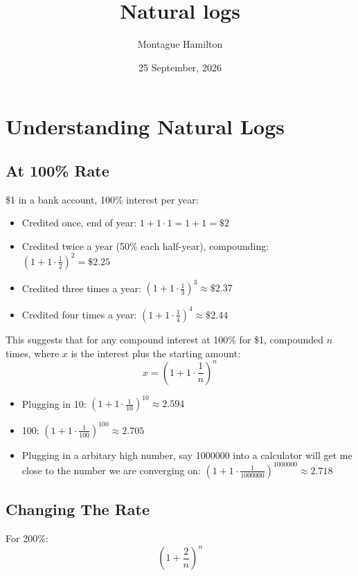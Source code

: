 \documentclass{article}
\begin{document}
\title{Natural logs}
\author{Montague Hamilton}
\date{25 September, 2026}
\maketitle

\section{Understanding Natural Logs}
\subsection{At 100\% Rate}

\$1 in a bank account, 100\% interest per year:
\begin{itemize}
  \item Credited once, end of year: $1 + 1 \cdot 1 = 1 + 1 = \$2$
  \item Credited twice a year (50\% each half-year), compounding: $(1 + 1 \cdot \frac{1}{2})^{2} = \$2.25$
  \item Credited three times a year: $(1 + 1 \cdot \frac{1}{3})^{3} \approx \$2.37$
  \item Credited four times a year: $(1 + 1 \cdot \frac{1}{4})^4 \approx \$2.44$
\end{itemize}
This suggests that for any compound interest at 100\% for \$1, compounded $n$ times,
where $x$ is the interest plus the starting amount:
\[
  x = \left(1 + 1 \cdot \frac{1}{n} \right)^{n}
\]
\begin{itemize}  
  \item Plugging in 10: $(1 + 1 \cdot \frac{1}{10})^{10} \approx 2.594$
  \item 100: $(1 + 1 \cdot \frac{1}{100})^{100} \approx  2.705$
  \item Plugging in a arbitary high number, say 1000000 into a calculator will get me close 
  to the number we are converging on: $(1 + 1 \cdot \frac{1}{1000000})^{1000000} \approx 2.718$
\end{itemize}

\newpage
\subsection{Changing The Rate}
For 200\%:
\[
  \left( 1 + \frac{2}{n}\right)^{n}
\]
\end{document}
